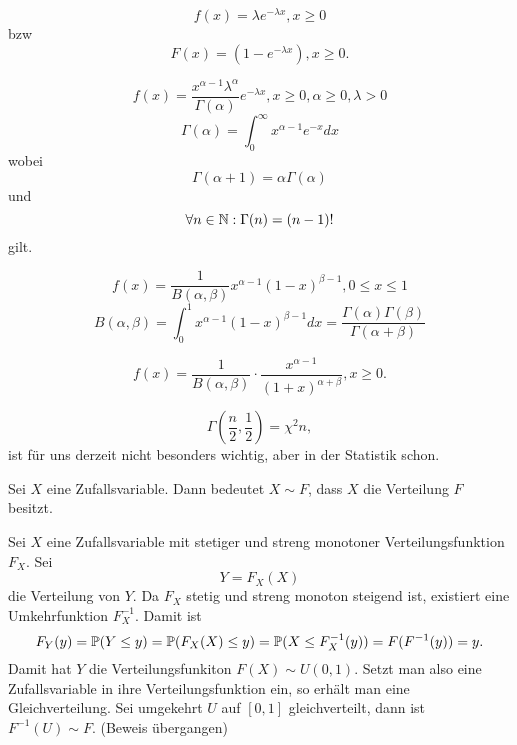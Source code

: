 				\begin{defi}
					\[ f(x)=\lambda e^{-\lambda x}, x\ge 0 \]
					bzw
					\[ F(x)=(1-e^{-\lambda x}), x\ge 0. \]					
				\end{defi}
				
				\begin{defi}[Gammaverteilung]
					\[ f(x)=\frac{x^{\alpha-1}\lambda^\alpha}{\Gamma(\alpha)}e^{-\lambda x}, x\ge 0, \alpha \ge 0, \lambda >0 \]
					\[ \Gamma(\alpha)=\int_0^\infty x^{\alpha-1}e^{-x}dx \]
					wobei
					\[ \Gamma(\alpha+1)=\alpha\Gamma(\alpha) \]
					und
					\[ \forall n\in\N: \Gamma(n)=(n-1)! \]
					gilt.
				\end{defi}
				
				\begin{defi}
					\[ f(x)=\frac{1}{B(\alpha,\beta)} x^{\alpha-1}(1-x)^{\beta-1}, 0\le x\le 1\]
					\[ B(\alpha, \beta)=\int_0^1 x^{\alpha-1}(1-x)^{\beta-1} dx=\frac{\Gamma(\alpha)\Gamma(\beta)}{\Gamma(\alpha+\beta)} \]
				\end{defi}
				
				\begin{defi}
					\[ f(x)=\frac{1}{B(\alpha,\beta)}\cdot \frac{x^{\alpha-1}}{(1+x)^{\alpha+\beta}}, x\ge 0.\]
				\end{defi}
				
				\begin{defi}
					\[ \Gamma(\frac{n}{2},\frac{1}{2})=\chi^2 n, \]
					ist für uns derzeit nicht besonders wichtig, aber in der Statistik schon. 
				\end{defi}
				
				\begin{defi}
					Sei $X$ eine Zufallsvariable. Dann bedeutet $X\sim F$, dass $X$ die Verteilung $F$ besitzt. 
				\end{defi}
				
				\begin{bsp}
					Sei $X$ eine Zufallsvariable mit stetiger und streng monotoner Verteilungsfunktion $F_X$. Sei 
					\[ Y = F_X(X) \]
					die Verteilung von $Y$. Da $F_X$ stetig und streng monoton steigend ist, existiert eine Umkehrfunktion $F_X^{-1}$. Damit ist
					\[ F_Y(y)=\P(Y\le y)=\P(F_X(X)\le y)=\P(X\le F_X^{-1}(y))=F(F^{-1}(y))=y. \]
					Damit hat $Y$ die Verteilungsfunkiton $F(X)\sim U(0,1)$. Setzt man also eine Zufallsvariable in ihre Verteilungsfunktion ein, so erhält man eine Gleichverteilung. \newline
					Sei umgekehrt $U$ auf $[0,1]$ gleichverteilt, dann ist $F^{-1}(U)\sim F$. (Beweis übergangen)
				\end{bsp}
				
